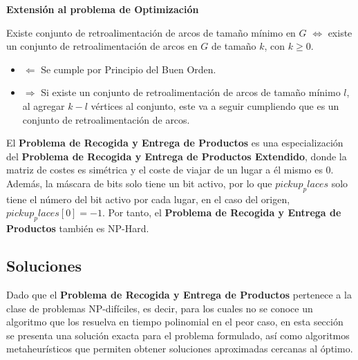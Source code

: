 \documentclass[twocolumn, fontsize=10pt]{article}
\begin{document}
\textbf{Extensión al problema de Optimización}

Existe conjunto de retroalimentación de arcos de tamaño mínimo en \(G\) \(\iff\) existe un conjunto de retroalimentación de arcos en \(G\) de tamaño \(k\), con \(k \geq 0\).
\begin{itemize}
    \item \(\Leftarrow\) 
    Se cumple por Principio del Buen Orden.
    \item \(\Rightarrow\) 
    Si existe un conjunto de retroalimentación de arcos de tamaño mínimo \(l\), al agregar \(k-l\) vértices al conjunto, este va a seguir cumpliendo que es un conjunto de retroalimentación de arcos.
\end{itemize}

El \textbf{Problema de Recogida y Entrega de Productos}  es una especialización del \textbf{Problema de Recogida y Entrega de Productos Extendido}, donde la matriz de costes es simétrica y el coste de viajar de un lugar a él mismo es \(0\). Además, la máscara de bits solo tiene un bit activo, por lo que \(pickup_places\) solo tiene el número del bit activo por cada lugar, en el caso del origen, \(pickup_places[0]=-1\). Por tanto, el \textbf{Problema de Recogida y Entrega de Productos} también es NP-Hard.

\subsection{Soluciones}
Dado que el \textbf{Problema de Recogida y Entrega de Productos} pertenece a la clase de problemas NP-difíciles, es decir, para los cuales no se conoce un algoritmo que los resuelva en tiempo polinomial en el peor caso, en esta sección se presenta una solución exacta para el problema formulado, así como algoritmos metaheurísticos que permiten obtener soluciones aproximadas cercanas al óptimo.
\end{document}

